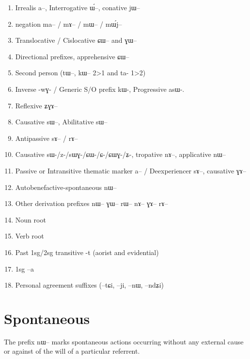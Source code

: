 \documentclass[oldfontcommands,oneside,a4paper,11pt]{article}
\newcommand{\ipa}[1]{{\phon \mbox{#1}}} %
\begin{document}
\begin{landscape}
\begin{multicols}{2}
\begin{enumerate}
\item Irrealis  \ipa{a}--, Interrogative \ipa{ɯ́}--, conative \ipa{jɯ}--
\item negation \ipa{ma}-- / \ipa{mɤ}-- / \ipa{mɯ}-- / \ipa{mɯ́j}--
\item Translocative / Cislocative \ipa{ɕɯ}-- and \ipa{ɣɯ}--
\item Directional prefixes, apprehensive \ipa{ɕɯ}--
\item Second person (\ipa{tɯ}--, \ipa{kɯ}-- 2>1 and ta- 1>2)
\item Inverse -\ipa{wɣ}- / Generic S/O prefix \ipa{kɯ}-, Progressive \ipa{asɯ}-. 
\item Reflexive \ipa{ʑɣɤ}-- 
\item Causative \ipa{sɯ}--, Abilitative \ipa{sɯ}--
\item  Antipassive  \ipa{sɤ}-- / \ipa{rɤ}--
\item Causative \ipa{sɯ-/z-/sɯɣ-/ɕɯ-/ɕ-/ɕɯɣ-/ʑ-}, tropative \ipa{nɤ}--, applicative \ipa{nɯ}--
\item Passive or Intransitive thematic marker \ipa{a}-- / Deexperiencer \ipa{sɤ}--, causative \ipa{ɣɤ--}
\item Autobenefactive-spontaneous \ipa{nɯ}--
\item Other derivation prefixes \ipa{nɯ}-- \ipa{ɣɯ}-- \ipa{rɯ}-- \ipa{nɤ}-- \ipa{ɣɤ}-- \ipa{rɤ}--
\item Noun root
\item Verb root 
\item Past 1sg/2sg transitive -\ipa{t} (aorist and evidential)
\item 1sg --\ipa{a}
\item Personal agreement suffixes (--\ipa{tɕi}, --\ipa{ji}, --\ipa{nɯ}, --\ipa{ndʑi})
\end{enumerate}


\end{multicols}
  \end{landscape}
 
 
 
 
 
\section{Spontaneous}
The prefix \ipa{nɯ--} marks spontaneous actions  occurring without any external cause or against of the will of a particular referrent.
\end{document}
